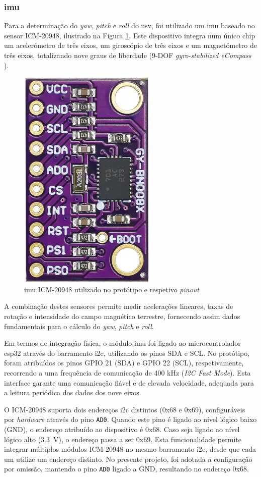 \subsubsection{\acrfull{imu}}

Para a determinação do \emph{yaw}, \emph{pitch} e \emph{roll} do \gls{usv}, foi utilizado um \gls{imu} baseado no sensor ICM-20948, ilustrado na Figura \ref{fig:imu}. Este dispositivo integra num único chip um acelerómetro de três eixos, um giroscópio de três eixos e um magnetómetro de três eixos, totalizando nove graus de liberdade (9-DOF \emph{gyro-stabilized eCompass} \cite{9dof}). 

\begin{figure}[H]
    \centering
    \includegraphics[width=0.25\linewidth]{figuras/imu-icm.jpg}
    \caption{\gls{imu} ICM-20948 utilizado no protótipo e respetivo \emph{pinout}}
    \label{fig:imu}
\end{figure}

A combinação destes sensores permite medir acelerações lineares, taxas de rotação e intensidade do campo magnético terrestre, fornecendo assim dados fundamentais para o cálculo do \emph{yaw},  \emph{pitch} e \emph{roll}.

Em termos de integração física, o módulo \gls{imu} foi ligado ao microcontrolador \gls{esp32} através do barramento \gls{i2c}, utilizando os pinos SDA e SCL. No protótipo, foram atribuídos os pinos GPIO 21 (SDA) e GPIO 22 (SCL), respetivamente, recorrendo a uma frequência de comunicação de 400 kHz (\emph{I2C Fast Mode}). Esta interface garante uma comunicação fiável e de elevada velocidade, adequada para a leitura periódica dos dados dos nove eixos.

O ICM-20948 suporta dois endereços \gls{i2c} distintos (0x68 e 0x69), configuráveis por \emph{hardware} através do pino \texttt{AD0}. Quando este pino é ligado ao nível lógico baixo (GND), o endereço atribuído ao dispositivo é 0x68. Caso seja ligado ao nível lógico alto (3.3~V), o endereço passa a ser 0x69. Esta funcionalidade permite integrar múltiplos módulos ICM-20948 no mesmo barramento \gls{i2c}, desde que cada um utilize um endereço distinto. No presente projeto, foi adotada a configuração por omissão, mantendo o pino \texttt{AD0} ligado a GND, resultando no endereço 0x68.

